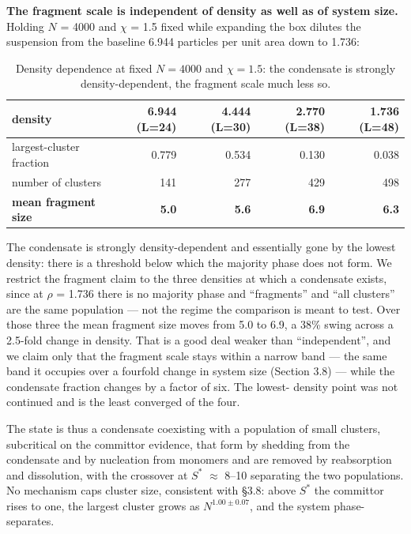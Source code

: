 \documentclass[aps,pre,preprint,superscriptaddress,nofootinbib,longbibliography]{revtex4-2}
\begin{document}
\textbf{The fragment scale is independent of density as well as of system size.} Holding $N$ = 4000 and $\chi$ = 1.5 fixed while expanding the box dilutes the suspension from the baseline 6.944 particles per unit area down to 1.736:

\begin{table}[htbp]
\caption{Density dependence at fixed $N=4000$ and $\chi=1.5$: the condensate is strongly density-dependent, the fragment scale much less so.}
\label{tab:12}
\begin{ruledtabular}
\begin{tabular}{lrrrr}
density & 6.944 (L=24) & 4.444 (L=30) & 2.770 (L=38) & 1.736 (L=48) \\
\hline
largest-cluster fraction & 0.779 & 0.534 & 0.130 & 0.038 \\
number of clusters & 141 & 277 & 429 & 498 \\
\textbf{mean fragment size} & \textbf{5.0} & \textbf{5.6} & \textbf{6.9} & \textbf{6.3} \\
\end{tabular}
\end{ruledtabular}
\end{table}

The condensate is strongly density-dependent and essentially gone by the lowest density: there is a threshold below which the majority phase does not form. We restrict the fragment claim to the three densities at which a condensate exists, since at $\rho$ = 1.736 there is no majority phase and ``fragments'' and ``all clusters'' are the same population --- not the regime the comparison is meant to test. Over those three the mean fragment size moves from 5.0 to 6.9, a 38\% swing across a 2.5-fold change in density. That is a good deal weaker than ``independent'', and we claim only that the fragment scale stays within a narrow band --- the same band it occupies over a fourfold change in system size (Section 3.8) --- while the condensate fraction changes by a factor of six. The lowest- density point was not continued and is the least converged of the four.

The state is thus a condensate coexisting with a population of small clusters, subcritical on the committor evidence, that form by shedding from the condensate and by nucleation from monomers and are removed by reabsorption and dissolution, with the crossover at $S^*$ $\approx$ 8--10 separating the two populations. No mechanism caps cluster size, consistent with \S{}3.8: above $S^*$ the committor rises to one, the largest cluster grows as $N^{1.00\pm0.07}$, and the system phase-separates.
\end{document}
